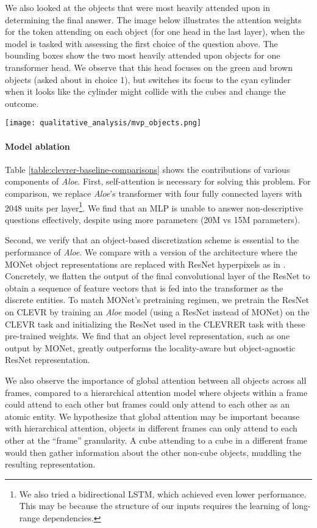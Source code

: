 \documentclass{article}
\newcommand{\Model}{\emph{Aloe}}
\begin{document}
We also looked at the objects that were most heavily attended upon in determining the final answer.
The image below illustrates the attention weights for the  token
attending on each object (for one head in the last layer),
when the model is tasked with assessing the first choice of the  question above.
The bounding boxes show the two most heavily attended upon objects for one transformer head.
We observe that this head focuses on the green and brown objects (asked about in choice 1), but switches its focus to the cyan cylinder 
when it looks like the cylinder
might collide with the cubes and change the outcome.

\noindent\texttt{[image: qualitative\_analysis/mvp\_objects.png]}




\paragraph{Model ablation} Table \ref{table:clevrer-baseline-comparisons} shows the contributions
of various components of \Model{}.
First, self-attention is necessary for solving this problem.
For comparison, we replace \Model{}'s transformer
with four fully connected layers with 2048 units per layer\footnote{We also tried a bidirectional LSTM, which achieved even lower performance. This may be because the structure of our inputs requires the learning of long-range dependencies.}.
We find that an MLP is unable to answer non-descriptive questions effectively,
despite using more parameters (20M vs 15M parameters).

Second, we verify that an object-based discretization scheme is essential to the performance of \Model{}.
We compare with a version of the architecture where the MONet object representations 
are replaced with ResNet hyperpixels as in  \citet{zambaldi2018deep}.
Concretely, we flatten the output of the final convolutional layer of the ResNet to obtain
a sequence of
feature vectors that is fed into the transformer
as the discrete entities.
To match MONet's pretraining regimen,
we pretrain the ResNet on CLEVR \citep{Johnson2016clevr} by training an \Model{} model (using a ResNet instead of MONet) on the CLEVR task and initializing the ResNet used in the CLEVRER task with these pre-trained weights.
We find that
an object level representation, such as one output by MONet,
greatly outperforms the locality-aware but object-agnostic ResNet representation.



We also observe the importance of global attention
between all objects across all frames,
compared to a hierarchical attention model where objects within
a frame could attend to each other but frames could only attend
to each other as an atomic entity.
We hypothesize that global attention may be important because with hierarchical attention, objects in different frames can only attend to each other at the ``frame'' granularity.
A cube attending to a cube in a different frame would then gather information about the other non-cube objects, muddling the resulting representation.
\end{document}
